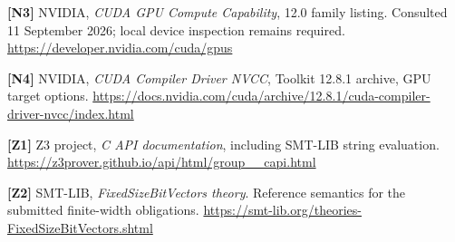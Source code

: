 \documentclass[11pt,a4paper]{article}
\begin{document}
\textbf{{[}N3{]}} NVIDIA, \emph{CUDA GPU Compute Capability}, 12.0
family listing. Consulted 11 September 2026; local device inspection
remains required. \url{https://developer.nvidia.com/cuda/gpus}

\textbf{{[}N4{]}} NVIDIA, \emph{CUDA Compiler Driver NVCC}, Toolkit
12.8.1 archive, GPU target options.
\url{https://docs.nvidia.com/cuda/archive/12.8.1/cuda-compiler-driver-nvcc/index.html}

\textbf{{[}Z1{]}} Z3 project, \emph{C API documentation}, including
SMT-LIB string evaluation.
\url{https://z3prover.github.io/api/html/group__capi.html}

\textbf{{[}Z2{]}} SMT-LIB, \emph{FixedSizeBitVectors theory}. Reference
semantics for the submitted finite-width obligations.
\url{https://smt-lib.org/theories-FixedSizeBitVectors.shtml}
\end{document}
